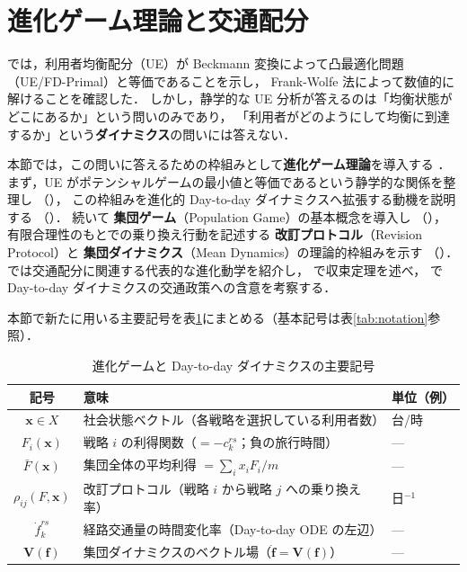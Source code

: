 
\section{進化ゲーム理論と交通配分}
\label{sec:ch6-evogame}

では，利用者均衡配分（UE）が
Beckmann 変換によって凸最適化問題（UE/FD-Primal）と等価であることを示し，
Frank-Wolfe 法によって数値的に解けることを確認した\cite{Beckmann1956,Wardrop1952}．
しかし，静学的な UE 分析が答えるのは「均衡状態がどこにあるか」という問いのみであり，
「利用者がどのようにして均衡に到達するか」という\textbf{ダイナミクス}の問いには答えない．

本節では，この問いに答えるための枠組みとして\textbf{進化ゲーム理論}を導入する
\cite{Sandholm2010,Sandholm2001}．
まず，UE がポテンシャルゲームの最小値と等価であるという静学的な関係を整理し
（），
この枠組みを進化的 Day-to-day ダイナミクスへ拡張する動機を説明する
（）．
続いて \textbf{集団ゲーム}（Population Game）の基本概念を導入し
（），
有限合理性のもとでの乗り換え行動を記述する
\textbf{改訂プロトコル}（Revision Protocol）と
\textbf{集団ダイナミクス}（Mean Dynamics）の理論的枠組みを示す
（）．
 では交通配分に関連する代表的な進化動学を紹介し，
 で収束定理を述べ，
 で Day-to-day ダイナミクスの交通政策への含意を考察する．

本節で新たに用いる主要記号を表\ref{tab:ch6-notation}にまとめる（基本記号は表\ref{tab:notation}参照）．

\begin{table}[hbtp]
  \centering
  \caption{進化ゲームと Day-to-day ダイナミクスの主要記号}
  \label{tab:ch6-notation}
  \begin{tabular}{cll}
    \toprule
    記号 & 意味 & 単位（例） \\
    \midrule
    $\boldsymbol{x} \in X$ & 社会状態ベクトル（各戦略を選択している利用者数） & 台/時 \\
    $F_i(\boldsymbol{x})$  & 戦略 $i$ の利得関数（$= -c_k^{rs}$；負の旅行時間） & — \\
    $\bar{F}(\boldsymbol{x})$ & 集団全体の平均利得 $= \sum_i x_i F_i / m$ & — \\
    $\rho_{ij}(F,\boldsymbol{x})$ & 改訂プロトコル（戦略 $i$ から戦略 $j$ への乗り換え率） & 日$^{-1}$ \\
    $\dot{f}_k^{rs}$       & 経路交通量の時間変化率（Day-to-day ODE の左辺） & — \\
    $\boldsymbol{V}(\boldsymbol{f})$ & 集団ダイナミクスのベクトル場（$\dot{\boldsymbol{f}} = \boldsymbol{V}(\boldsymbol{f})$） & — \\
    \bottomrule
  \end{tabular}
\end{table}

